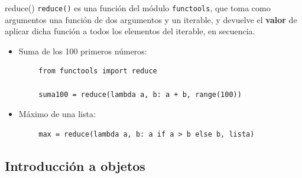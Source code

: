\documentclass[10pt]{beamer} %
\begin{document}
\begin{frame}[fragile]{reduce()}
    \texttt{reduce()} es una función del módulo \texttt{functools}, que toma como argumentos una función de dos argumentos y un iterable, y devuelve el \textbf{valor} de aplicar dicha función a todos los elementos del iterable, en secuencia.
    \begin{itemize}
        \item Suma de los 100 primeros números:
    \end{itemize}
    \begin{verbatim}
        from functools import reduce
        
        suma100 = reduce(lambda a, b: a + b, range(100))
    \end{verbatim}
    \begin{itemize}
        \item Máximo de una lista:
    \end{itemize}
    \begin{verbatim}
        max = reduce(lambda a, b: a if a > b else b, lista)
    \end{verbatim}
\end{frame}

\subsection{Introducción a objetos}
\end{document}
